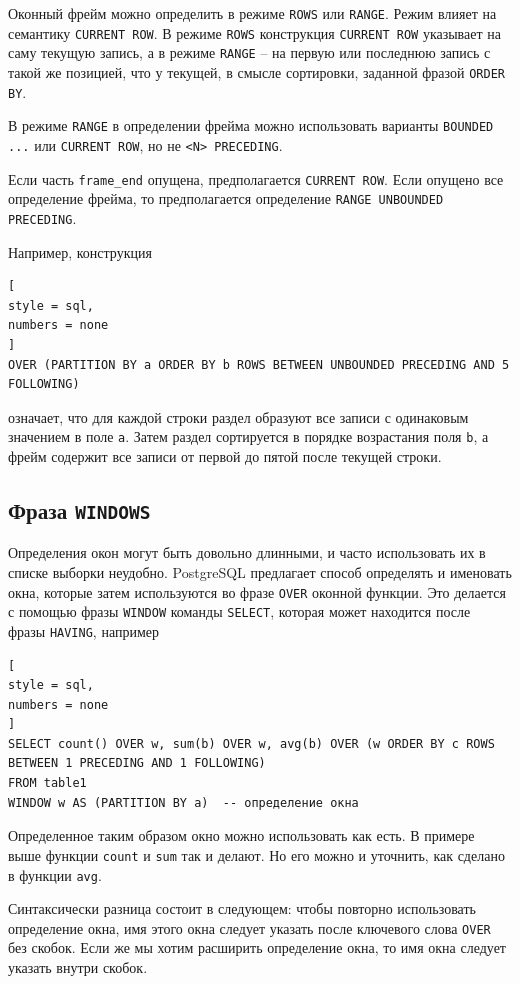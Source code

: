 \documentclass[%
	11pt,
	a4paper,
	utf8,
		]{article}
\begin{document}
Оконный фрейм можно определить в режиме \texttt{ROWS} или \texttt{RANGE}. Режим влияет на семантику \texttt{CURRENT ROW}. В режиме \texttt{ROWS} конструкция \texttt{CURRENT ROW} указывает на саму текущую запись, а в режиме \texttt{RANGE} -- на первую или последнюю запись с такой же позицией, что у текущей, в смысле сортировки, заданной фразой \texttt{ORDER BY}.

В режиме \texttt{RANGE} в определении фрейма можно использовать варианты \texttt{BOUNDED ...} или \texttt{CURRENT ROW}, но не \texttt{<N> PRECEDING}.

Если часть \texttt{frame\_end} опущена, предполагается \texttt{CURRENT ROW}. Если опущено все определение фрейма, то предполагается определение \texttt{RANGE UNBOUNDED PRECEDING}.

Например, конструкция
\begin{lstlisting}[
style = sql,
numbers = none
]
OVER (PARTITION BY a ORDER BY b ROWS BETWEEN UNBOUNDED PRECEDING AND 5 FOLLOWING)
\end{lstlisting}
означает, что для каждой строки раздел образуют все записи с одинаковым значением в поле \texttt{a}. Затем раздел сортируется в порядке возрастания поля \texttt{b}, а фрейм содержит все записи от первой до пятой после текущей строки.

\subsection{Фраза \texttt{WINDOWS}}

Определения окон могут быть довольно длинными, и часто использовать их в списке выборки неудобно. PostgreSQL предлагает способ определять и именовать окна, которые затем используются во фразе \texttt{OVER} оконной функции. Это делается с помощью фразы \texttt{WINDOW} команды \texttt{SELECT}, которая может находится после фразы \texttt{HAVING}, например
\begin{lstlisting}[
style = sql,
numbers = none
]
SELECT count() OVER w, sum(b) OVER w, avg(b) OVER (w ORDER BY c ROWS BETWEEN 1 PRECEDING AND 1 FOLLOWING)
FROM table1
WINDOW w AS (PARTITION BY a)  -- определение окна
\end{lstlisting}

Определенное таким образом окно можно использовать как есть. В примере выше функции \texttt{count} и \texttt{sum} так и делают. Но его можно и уточнить, как сделано в функции \texttt{avg}.

Синтаксически разница состоит в следующем: чтобы повторно использовать определение окна, имя этого окна следует указать после ключевого слова \texttt{OVER} без скобок. Если же мы хотим расширить определение окна, то имя окна следует указать внутри скобок.
\end{document}
